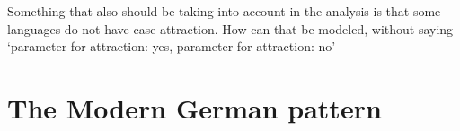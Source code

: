 







Something that also should be taking into account in the analysis is that some languages do not have case attraction. How can that be modeled, without saying `parameter for attraction: yes, parameter for attraction: no'


\section{The Modern German pattern}

